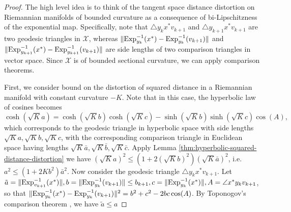 \begin{proof}
	The high level idea is to think of the tangent space distance distortion on Riemannian manifolds of bounded curvature as a consequence of bi-Lipschitzness of the exponential map. Specifically, note that $\triangle y_k x^* v_{k+1}$ and $\triangle y_{k+1} x^* v_{k+1}$ are two geodesic triangles in $\mathcal{X}$, whereas $\|\mathrm{Exp}_{y_k}^{-1}(x^*)-\mathrm{Exp}_{y_k}^{-1}(v_{k+1})\|$ and $\|\mathrm{Exp}_{y_{k+1}}^{-1}(x^*)-\mathrm{Exp}_{y_{k+1}}^{-1}(v_{k+1})\|$ are side lengths of two comparison triangles in vector space. Since $\mathcal{X}$ is of bounded sectional curvature, we can apply comparison theorems.
	
	First, we consider bound on the distortion of squared distance in a Riemannian manifold with constant curvature $-K$. Note that in this case, the hyperbolic law of cosines becomes
	\[ \cosh(\sqrt{K}a) = \cosh(\sqrt{K}b)\cosh(\sqrt{K}c) - \sinh(\sqrt{K}b)\sinh(\sqrt{K}c)\cos(A), \]
	which corresponds to the geodesic triangle in hyperbolic space with side lengths $\sqrt{K}a, \sqrt{K}b,\sqrt{K}c$, with the corresponding comparison triangle in Euclidean space having lengths $\sqrt{K}\bar{a}, \sqrt{K}\bar{b}, \sqrt{K}\bar{c}$. Apply Lemma \ref{thm:hyperbolic-squared-distance-distortion} we have $(\sqrt{K}a)^2 \le (1+2(\sqrt{K}b)^2)(\sqrt{K}\bar{a})^2$, i.e. $a^2 \le (1+2K b^2)\bar{a}^2$.
	Now consider the geodesic triangle $\triangle y_k x^* v_{k+1}$. Let $\tilde{a}=\|\mathrm{Exp}_{v_{k+1}}^{-1}(x^*)\|, b=\|\mathrm{Exp}_{y_k}^{-1}(v_{k+1})\|\le b_{k+1}, c=\|\mathrm{Exp}_{y_k}^{-1}(x^*)\|, A=\angle x^* y_k v_{k+1}$, so that $\|\mathrm{Exp}_{y_k}^{-1}(x^*)-\mathrm{Exp}_{y_k}^{-1}(v_{k+1})\|^2 = b^2+c^2-2bc\cos(A)$. By Toponogov's comparison theorem \citep{burago2001course}, we have $\tilde{a}\le a$

\end{proof}
